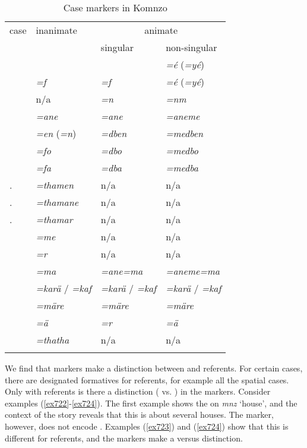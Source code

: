 \begin{table} 
\caption{Case markers in Komnzo} 
\label{caseformatives}
	\begin{tabularx}{.8\textwidth}{Xlll}
		\lsptoprule
			{{case}}& {{inanimate}}&\multicolumn{2}{c}{{animate}}\\
			&&\multicolumn{1}{l}{{singular}}&\multicolumn{1}{l}{{non-singular}}\\ \midrule
			{\Abs}&\Zero{}&\Zero{}&\emph{=é} (\emph{=yé})\\
			{\Erg}&\emph{=f}&\emph{=f}&\emph{=é} (\emph{=yé})\\									
			{\Dat}&n/a&\emph{=n}&\emph{=nm}\\
			{\Poss}&\emph{=ane}&\emph{=ane}&\emph{=aneme}\\
			{\Loc}&\emph{=en} (\emph{=n})&\emph{=dben}& \emph{=medben}\\
			{\All}&\emph{=fo}&\emph{=dbo}& \emph{=medbo}\\
			{\Abl}&\emph{=fa}&\emph{=dba}& \emph{=medba}\\									
			\Temp.\Loc&\emph{=thamen}&n/a&n/a\\
			\Temp.\Poss&\emph{=thamane}&n/a&n/a\\
			\Temp.\Purp&\emph{=thamar}&n/a&n/a\\
			\Ins&\emph{=me}&n/a&n/a\\
			{\Purp}&\emph{=r}&n/a&n/a\\
			{\Char}&\emph{=ma}&\emph{=ane=ma}&\emph{=aneme=ma}\\
			{\Prop}&\emph{=karä} / \emph{=kaf}&\emph{=karä} / \emph{=kaf}&\emph{=karä} / \emph{=kaf}\\
			{\Priv}&\emph{=märe}&\emph{=märe}&\emph{=märe}\\
			{\Assoc}\super{a}&\emph{=ä}&\emph{=r}&\emph{=ä}\\
			\Simil&\emph{=thatha}&n/a&n/a\\
		\lspbottomrule
			\multicolumn{4}{l}{\footnotesize \super{a}The associative forms encode {\Du} versus {\Pl} (\S\ref{inclusorycontruction}).}
	\end{tabularx}
\end{table}%

\newpage
We find that  markers make a distinction between  and  referents. For certain cases, there are designated formatives for  referents, for example all the spatial cases. Only with  referents is there a  distinction ({\Sg} vs. {\Nsg}) in the  markers. Consider examples (\ref{ex722}-\ref{ex724}). The first example shows the   on \emph{mnz} `house', and the context of the story reveals that this is about several houses. The  marker, however, does not encode . Examples (\ref{ex723}) and (\ref{ex724}) show that this is different for  referents, and the  markers make a  versus  distinction.

